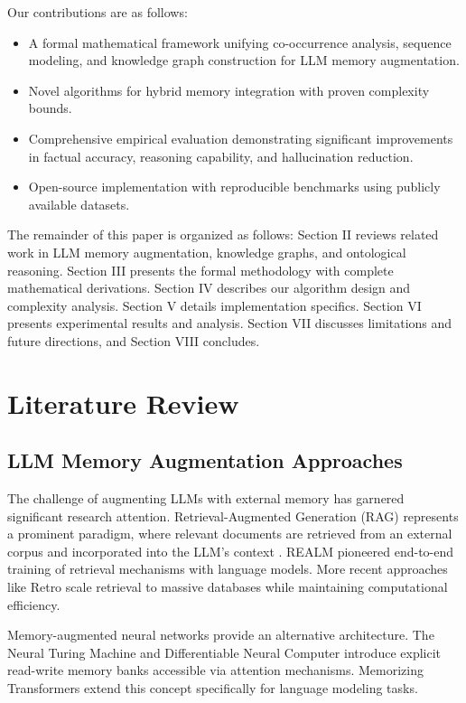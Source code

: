 \documentclass[conference]{IEEEtran}
\begin{document}
Our contributions are as follows:
\begin{itemize}
    \item A formal mathematical framework unifying co-occurrence analysis, sequence modeling, and knowledge graph construction for LLM memory augmentation.
    \item Novel algorithms for hybrid memory integration with proven complexity bounds.
    \item Comprehensive empirical evaluation demonstrating significant improvements in factual accuracy, reasoning capability, and hallucination reduction.
    \item Open-source implementation with reproducible benchmarks using publicly available datasets.
\end{itemize}

The remainder of this paper is organized as follows: Section II reviews related work in LLM memory augmentation, knowledge graphs, and ontological reasoning. Section III presents the formal methodology with complete mathematical derivations. Section IV describes our algorithm design and complexity analysis. Section V details implementation specifics. Section VI presents experimental results and analysis. Section VII discusses limitations and future directions, and Section VIII concludes.

\section{Literature Review}

\subsection{LLM Memory Augmentation Approaches}

The challenge of augmenting LLMs with external memory has garnered significant research attention. Retrieval-Augmented Generation (RAG) represents a prominent paradigm, where relevant documents are retrieved from an external corpus and incorporated into the LLM's context \cite{lewis2020retrieval}. REALM \cite{guu2020retrieval} pioneered end-to-end training of retrieval mechanisms with language models. More recent approaches like Retro \cite{borgeaud2022improving} scale retrieval to massive databases while maintaining computational efficiency.

Memory-augmented neural networks provide an alternative architecture. The Neural Turing Machine \cite{graves2014neural} and Differentiable Neural Computer \cite{graves2016hybrid} introduce explicit read-write memory banks accessible via attention mechanisms. Memorizing Transformers \cite{wu2022memorizing} extend this concept specifically for language modeling tasks.
\end{document}
